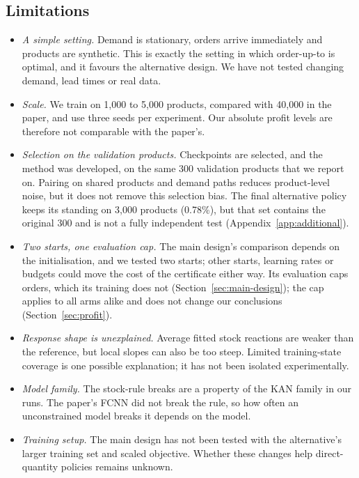 \documentclass[conference]{IEEEtran}
\begin{document}
\subsection{Limitations}\label{sec:limitations}
\begin{itemize}
\item \textit{A simple setting.} Demand is stationary, orders arrive immediately and products are synthetic. This is
exactly the setting in which order-up-to is optimal, and it favours the alternative design. We have not tested
changing demand, lead times or real data.
\item \textit{Scale.} We train on 1,000 to 5,000 products, compared with 40,000 in the paper, and use three seeds per
experiment. Our absolute profit levels are therefore not comparable with the paper's.
\item \textit{Selection on the validation products.} Checkpoints are selected, and the method was developed, on the
same 300 validation products that we report on. Pairing on shared products and demand paths reduces product-level
noise, but it does not remove this selection bias. The final alternative policy keeps its standing on 3,000 products
(0.78\%), but that set contains the original 300 and is not a fully independent test
(Appendix~\ref{app:additional}).
\item \textit{Two starts, one evaluation cap.} The main design's comparison depends on the initialisation, and we
tested two starts; other starts, learning rates or budgets could move the cost of the certificate either way. Its
evaluation caps orders, which its training does not (Section~\ref{sec:main-design}); the cap applies to all arms alike
and does not change our conclusions (Section~\ref{sec:profit}).
\item \textit{Response shape is unexplained.} Average fitted stock reactions are weaker than the reference, but
local slopes can also be too steep. Limited training-state coverage is one possible explanation; it has not been
isolated experimentally.
\item \textit{Model family.} The stock-rule breaks are a property of the KAN family in our runs. The paper's FCNN did
not break the rule, so how often an unconstrained model breaks it depends on the model.
\item \textit{Training setup.} The main design has not been tested with the alternative's larger training set and
scaled objective. Whether these changes help direct-quantity policies remains unknown.
\end{itemize}
\end{document}
